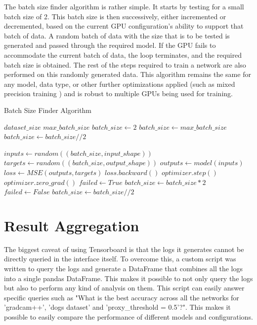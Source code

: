 The batch size finder algorithm is rather simple. It starts by testing for a small batch size of 2. This batch size is then successively, either incremented or decremented, based on the current GPU configuration's ability to support that batch of data.
A random batch of data with the size that is to be tested is generated and passed through the required model. If the GPU fails to accommodate the current batch of data, the loop terminates, and the required batch size is obtained. The rest of the steps required to train a network are also performed on this randomly generated data.
This algorithm remains the same for any model, data type, or other further optimizations applied (such as mixed precision training \cite{micikeviciusMixedPrecisionTraining2017}) and is robust to multiple GPUs being used for training.
\begin{algorithm}
    \caption{Batch Size Finder Algorithm}
    \label{alg:batch_size_finder}
    \begin{algorithmic}
        \REQUIRE $dataset\_size$
        \REQUIRE $max\_batch\_size$
        \STATE $batch\_size \leftarrow 2$
        \STATE $batch\_size \leftarrow max\_batch\_size$
        \ENDIF
        \STATE $batch\_size \leftarrow batch\_size // 2$
        \ENDIF

        \LOOP
        \STATE $inputs \leftarrow random((batch\_size,input\_shape))$
        \STATE $targets \leftarrow random((batch\_size,output\_shape))$
        \STATE $outputs \leftarrow model(inputs)$
        \STATE $loss \leftarrow MSE(outputs, targets)$
        \STATE $loss.backward()$
        \STATE $optimizer.step()$
        \STATE $optimizer.zero\_grad()$
        \STATE $failed \leftarrow True$
        \STATE $batch\_size \leftarrow batch\_size * 2$
        \ENDLOOP
        \STATE $failed \leftarrow False$
        \STATE $batch\_size \leftarrow batch\_size // 2$
        \ENDIF
        \ENDWHILE

    \end{algorithmic}
\end{algorithm}

\section{Result Aggregation} \label{sec:result_aggregation}
The biggest caveat of using Tensorboard is that the logs it generates cannot be directly queried in the interface itself. To overcome this, a custom script was written to query the logs and generate a DataFrame that combines all the logs into a single pandas DataFrame. This makes it possible to not only query the logs but also to perform any kind of analysis on them. This script can easily answer specific queries such as "What is the best accuracy across all the networks for 'gradcam++', 'dogs dataset' and 'proxy\_threshold = 0.5'?". This makes it possible to easily compare the performance of different models and configurations.

